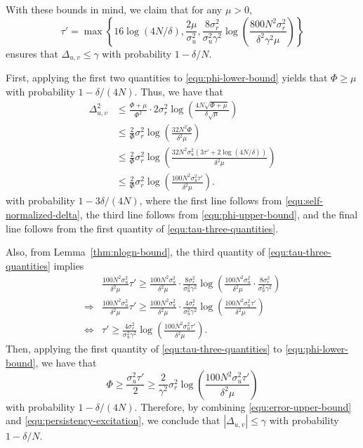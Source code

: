 \documentclass[11pt, twoside]{article}
\theoremstyle{definition}
\begin{document}
With these bounds in mind, we claim that for any $\mu > 0$,
\begin{equation}
\label{equ:tau-three-quantities}
    \tau' = \max\left\{16\log(4N/\delta), \frac{2\mu}{\sigma_u^2}, \frac{8\sigma_r^2}{\sigma_u^2 \gamma^2}\log\left(\frac{800 N^2 \sigma_r^2}{\delta^2\gamma^2\mu}\right)\right\}
\end{equation}
ensures that $\Delta_{u,v} \le \gamma$ with probability $1-\delta/N$.

First, applying the first two quantities to \eqref{equ:phi-lower-bound} yields that $\Phi \ge \mu$ with probability $1-\delta/(4N)$.
Thus, we have that
\begin{equation}
\label{equ:error-upper-bound}
\begin{aligned}
    \Delta_{u, v}^2 
    &\le \frac{\Phi+\mu}{\Phi^2} \cdot 2\sigma_r^2 \log\left(\frac{4N\sqrt{\Phi + \mu}}{\delta\sqrt{\mu}}\right) \\
    &\le \frac{2}{\Phi} \sigma_r^2 \log\left(\frac{32 N^2\Phi}{\delta^2\mu}\right) \\
    &\le \frac{2}{\Phi} \sigma_r^2 \log\left(\frac{32 N^2 \sigma_u^2 (3\tau' + 2 \log(4N/\delta))}{\delta^2\mu}\right) \\
    &\le \frac{2}{\Phi} \sigma_r^2 \log\left(\frac{100 N^2 \sigma_u^2 \tau'}{\delta^2\mu}\right).
\end{aligned}
\end{equation}
with probability $1-3\delta/(4N)$, where the first line follows from \eqref{equ:self-normalized-delta}, the third line follows from \eqref{equ:phi-upper-bound}, and the final line follows from the first quantity of \eqref{equ:tau-three-quantities}.

Also, from Lemma~\ref{thm:nlogn-bound}, the third quantity of \eqref{equ:tau-three-quantities} implies
\begin{align*}
    & \frac{100 N^2 \sigma_u^2}{\delta^2\mu} \tau' \ge \frac{100 N^2 \sigma_u^2}{\delta^2\mu} \cdot \frac{8\sigma_r^2}{\sigma_u^2 \gamma^2} \log\left(\frac{100 N^2 \sigma_u^2}{\delta^2\mu} \cdot \frac{8\sigma_r^2}{\sigma_u^2 \gamma^2}\right) \\
    \Rightarrow{}& \frac{100 N^2 \sigma_u^2}{\delta^2\mu} \tau' \ge \frac{100 N^2 \sigma_u^2}{\delta^2\mu} \cdot \frac{4\sigma_r^2}{\sigma_u^2 \gamma^2}  \log\left(\frac{100 N^2 \sigma_u^2 \tau'}{\delta^2\mu}\right) \\
    \Leftrightarrow{}& \tau' \ge \frac{4\sigma_r^2}{\sigma_u^2 \gamma^2}  \log\left(\frac{100 N^2 \sigma_u^2 \tau'}{\delta^2\mu}\right).
\end{align*}
Then, applying the first quantity of \eqref{equ:tau-three-quantities} to \eqref{equ:phi-lower-bound}, we have that
\begin{equation}
\label{equ:persistency-excitation}
\Phi \ge \frac{\sigma_u^2\tau'}{2} \ge \frac{2}{\gamma^2} \sigma_r^2 \log\left(\frac{100 N^2 \sigma_u^2 \tau'}{\delta^2\mu}\right)
\end{equation}
with probability $1 - \delta/(4N)$.
Therefore, by combining \eqref{equ:error-upper-bound} and \eqref{equ:persistency-excitation}, we conclude that $|\Delta_{u, v}| \le \gamma$ with probability $1-\delta/N$.
\end{document}
